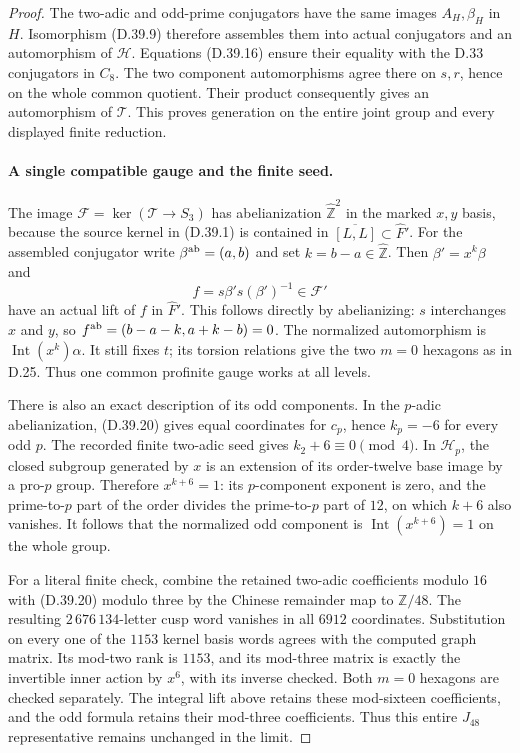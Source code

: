 \begin{proof}
The two-adic and odd-prime conjugators have the same
images $A_H,\beta_H$ in $H$. Isomorphism (D.39.9) therefore
assembles them into actual conjugators and an automorphism
of $\mathcal H$. Equations (D.39.16) ensure their equality
with the D.33 conjugators in $C_8$. The two component
automorphisms agree there on $s,r$, hence on the whole
common quotient. Their product consequently gives an
automorphism of $\mathcal T$. This proves generation
on the entire joint group and every displayed finite
reduction.

\paragraph{A single compatible gauge and the finite seed.}
The image $\mathcal F=\ker(\mathcal T\to S_3)$ has
abelianization $\widehat{\mathbb Z}^2$ in the marked
$x,y$ basis, because the source kernel in (D.39.1) is
contained in $\overline{[L,L]}\subset\widehat F'$.
For the assembled conjugator write
$\beta^{\rm ab}=(a,b)$ and set $k=b-a\in\widehat{\mathbb Z}$.
Then $\beta'=x^k\beta$ and
\[
 f=s\beta's(\beta')^{-1}\in\mathcal F'                   \tag{D.39.21}
\]
have an actual lift of $f$ in $\widehat F'$.
This follows directly by abelianizing: $s$ interchanges
$x$ and $y$, so $f^{\rm ab}=(b-a-k,a+k-b)=0$.
The normalized automorphism is
$\operatorname{Int}(x^k)\alpha$. It still fixes $t$;
its torsion relations give the two $m=0$ hexagons as
in D.25. Thus one common profinite gauge works at all
levels.

There is also an exact description of its odd components.
In the $p$-adic abelianization, (D.39.20) gives equal
coordinates for $c_p$, hence $k_p=-6$ for every odd
$p$. The recorded finite two-adic seed gives
$k_2+6\equiv0\pmod4$. In $\mathcal H_p$, the closed
subgroup generated by $x$ is an extension of its
order-twelve base image by a pro-$p$ group. Therefore
$x^{k+6}=1$: its $p$-component exponent is zero, and
the prime-to-$p$ part of the order divides the
prime-to-$p$ part of $12$, on which $k+6$ also vanishes.
It follows that the normalized odd component is
$\operatorname{Int}(x^{k+6})=1$ on the whole group.

For a literal finite check, combine the retained
two-adic coefficients modulo $16$ with (D.39.20)
modulo three by the Chinese remainder map to
$\mathbb Z/48$. The resulting $2\,676\,134$-letter cusp
word vanishes in all $6912$ coordinates. Substitution
on every one of the $1153$ kernel basis words agrees
with the computed graph matrix. Its mod-two rank is
$1153$, and its mod-three matrix is exactly the
invertible inner action by $x^6$, with its inverse
checked. Both $m=0$ hexagons are checked separately.
The integral lift above retains these mod-sixteen
coefficients, and the odd formula retains their
mod-three coefficients. Thus this entire $J_{48}$
representative remains unchanged in the limit.


\end{proof}
